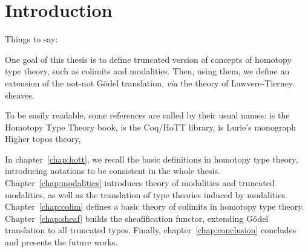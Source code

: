 \chapter{Introduction}
\label{chap:intro}


Things to say:

One goal of this thesis is to define truncated version of concepts of
homotopy type theory, such as colimits and modalities. Then, using
them, we define an extension of the not-not Gödel translation, {\em
  via} the theory of Lawvere-Tierney sheaves.

To be easily readable, some references are called by their usual
names: \cite{hottbook} is the Homotopy Type Theory book,
\cite{hottlib} is the Coq/HoTT library, \cite{lurie} is Lurie's
monograph Higher topos theory, \etc 

In chapter~\ref{chap:hott}, we recall the basic definitions in
homotopy type theory, introducing notations to be consistent in the
whole thesis. Chapter~\ref{chap:modalities} introduces theory of
modalities and truncated modalities, as well as the translation of
type theories induced by modalities. Chapter~\ref{chap:colim} defines
a basic theory of colimits in homotopy type
theory. Chapter~\ref{chap:sheaf} builds the sheafification functor,
extending Gödel translation to all truncated types. Finally,
chapter~\ref{chap:conclusion} concludes and presents the future
works. 
